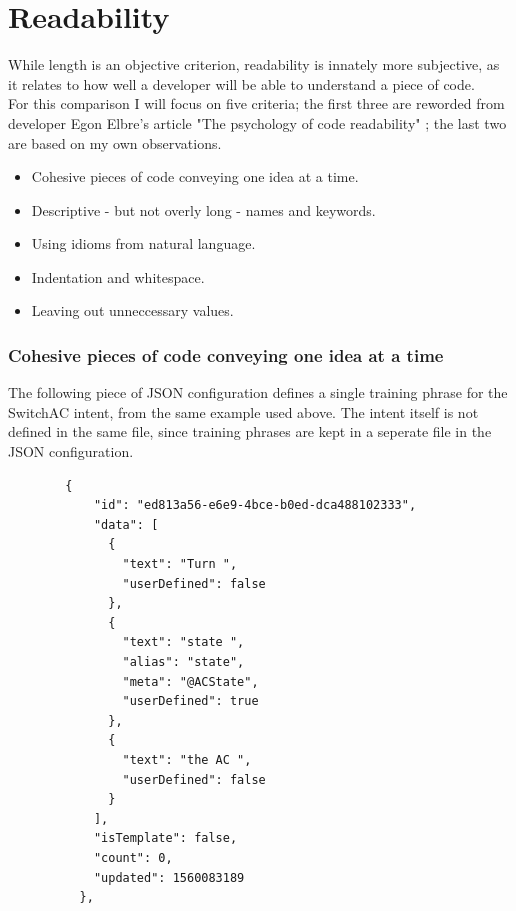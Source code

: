 \section{Readability}

While length is an objective criterion, readability is innately more subjective, as it relates to how well a developer will be able to understand a piece of code.\\
For this comparison I will focus on five criteria; the first three are reworded from developer Egon Elbre's article "The psychology of code readability" \cite{Elbre}; the last two are based on my own observations.
\begin{itemize}
    \item Cohesive pieces of code conveying one idea at a time.
    \item Descriptive - but not overly long - names and keywords.
    \item Using idioms from natural language.
    \item Indentation and whitespace.
    \item Leaving out unneccessary values.
\end{itemize}

\subsubsection{Cohesive pieces of code conveying one idea at a time}

The following piece of JSON configuration defines a single training phrase for the SwitchAC intent, from the same example used above. The intent itself is not defined in the same file, since training phrases are kept in a seperate file in the JSON configuration.
\begin{samepage}
    \begin{verbatim}
        {
            "id": "ed813a56-e6e9-4bce-b0ed-dca488102333",
            "data": [
              {
                "text": "Turn ",
                "userDefined": false
              },
              {
                "text": "state ",
                "alias": "state",
                "meta": "@ACState",
                "userDefined": true
              },
              {
                "text": "the AC ",
                "userDefined": false
              }
            ],
            "isTemplate": false,
            "count": 0,
            "updated": 1560083189
          },
    \end{verbatim}
\end{samepage}

